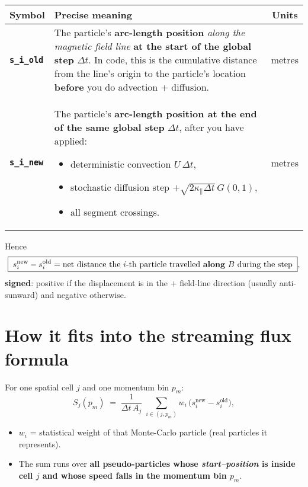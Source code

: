 \begin{table}[h!]
\centering
\begin{tabular}{|l|p{10.5cm}|c|}
\hline
\textbf{Symbol} & \textbf{Precise meaning} & \textbf{Units} \\
\hline
\texttt{\textbf{s\_i\_old}} & The particle’s \textbf{arc-length position} \emph{along the magnetic field line} \textbf{at the start of the global step} \( \Delta t \). In code, this is the cumulative distance from the line’s origin to the particle’s location \textbf{before} you do advection + diffusion. & metres \\
\hline
\texttt{\textbf{s\_i\_new}} & The particle’s \textbf{arc-length position at the end of the same global step} \( \Delta t \), after you have applied:
\begin{itemize}
    \item deterministic convection \( U\,\Delta t \),
    \item stochastic diffusion step \( +\sqrt{2\kappa_\parallel \Delta t}\,G(0,1) \),
    \item all segment crossings.
\end{itemize}
& metres \\
\hline
\end{tabular}
\end{table}

Hence
\[
\boxed{ \; s_i^{\text{new}} - s_i^{\text{old}} = \text{net distance the $i$-th particle travelled \textbf{along} $B$ during the step} \; },
\]
\noindent
\textbf{signed}: positive if the displacement is in the $+$ field-line direction (usually anti-sunward) and negative otherwise.

\bigskip

\section*{How it fits into the streaming flux formula}

For one spatial cell \( j \) and one momentum bin \( p_m \):
\[
S_j(p_m) \;=\;
\frac{1}{\Delta t\,A_j}\;
\sum_{i\in(j,p_m)}
w_i\,\bigl(s_i^{\text{new}}-s_i^{\text{old}}\bigr),
\]
\begin{itemize}
\item \( w_i \) = statistical weight of that Monte-Carlo particle (real particles it represents).
\item The sum runs over \textbf{all pseudo-particles whose \emph{start–position} is inside cell \( j \) and whose speed falls in the momentum bin \( p_m \)}.
\end{itemize}

